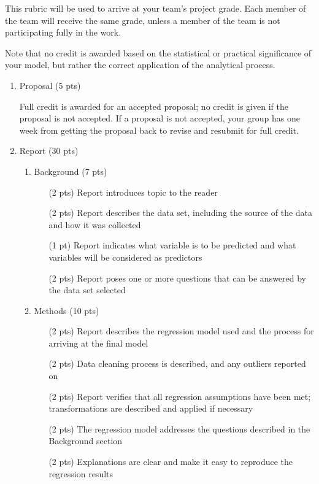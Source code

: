 \documentclass[12pt]{article}
\begin{document}
This rubric will be used to arrive at your team's project grade.  Each member of the team will receive the same grade, unless a member of the team is not participating fully in the work.

Note that no credit is awarded based on the statistical or practical significance of your model, but rather the correct application of the analytical process.

\begin{enumerate}
\item Proposal (5 pts)

Full credit is awarded for an accepted proposal; no credit is given if the proposal is not accepted. If a proposal is not accepted, your group has one week from getting the proposal back to revise and resubmit for full credit.

\item Report (30 pts)
  \begin{enumerate}
    \item Background (7 pts)
      \begin{enumerate}
      \item[(2 pts)] Report introduces topic to the reader
      \item[(2 pts)] Report describes the data set, including the source of the data and how it was collected
      \item[(1 pt)] Report indicates what variable is to be predicted and what variables will be considered as predictors
      \item[(2 pts)] Report poses one or more questions that can be answered by the data set selected
      \end{enumerate}

    \item Methods (10 pts)
      \begin{enumerate}
        \item[(2 pts)] Report describes the regression model used and the process for arriving at the final model
        \item[(2 pts)] Data cleaning process is described, and any outliers reported on
        \item[(2 pts)] Report verifies that all regression assumptions have been met; transformations are described and applied if necessary
        \item[(2 pts)] The regression model addresses the questions described in the Background section
        \item[(2 pts)] Explanations are clear and make it easy to reproduce the regression results
      \end{enumerate}


\end{enumerate}
\end{enumerate}
\end{document}
